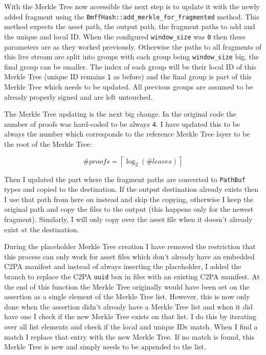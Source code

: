 With the Merkle Tree now accessible the next step is to update it with the newly added fragment using the \texttt{BmffHash::add\_merkle\_for\_fragmented} method. This method expects the asset path, the output path, the fragment paths to add and the unique and local ID. When the configured \texttt{window\_size} was \texttt{0} then these parameters are as they worked previously. Otherwise the paths to all fragments of this live stream are split into groups with each group being \texttt{window\_size} big, the final group can be smaller. The index of each group will be their local ID of this Merkle Tree (unique ID remains \texttt{1} as before) and the final group is part of this Merkle Tree which needs to be updated. All previous groups are assumed to be already properly signed and are left untouched.

The Merkle Tree updating is the next big change. In the original code the number of proofs was hard-coded to be always \texttt{4}. I have updated this to be always the number which corresponds to the reference Merkle Tree layer to be the root of the Merkle Tree:

\begin{equation}
    \#proofs = \left\lceil \log_2({\#leaves}) \right\rceil
    \label{eq:proofs}
\end{equation}

Then I updated the part where the fragment paths are converted to \texttt{PathBuf} types and copied to the destination. If the output destination already exists then I use that path from here on instead and skip the copying, otherwise I keep the original path and copy the files to the output (this happens only for the newest fragment). Similarly, I will only copy over the asset file when it doesn't already exist at the destination.

During the placeholder Merkle Tree creation I have removed the restriction that this process can only work for asset files which don't already have an embedded C2PA manifest and instead of always inserting the placeholder, I added the branch to replace the C2PA \texttt{uuid} box in files with an existing C2PA manifest. At the end of this function the Merkle Tree originally would have been set on the assertion as a single element of the Merkle Tree list. However, this is now only done when the assertion didn't already have a Merkle Tree list and when it did have one I check if the new Merkle Tree exists on that list. I do this by iterating over all list elements and check if the local and unique IDs match. When I find a match I replace that entry with the new Merkle Tree. If no match is found, this Merkle Tree is new and simply needs to be appended to the list.

